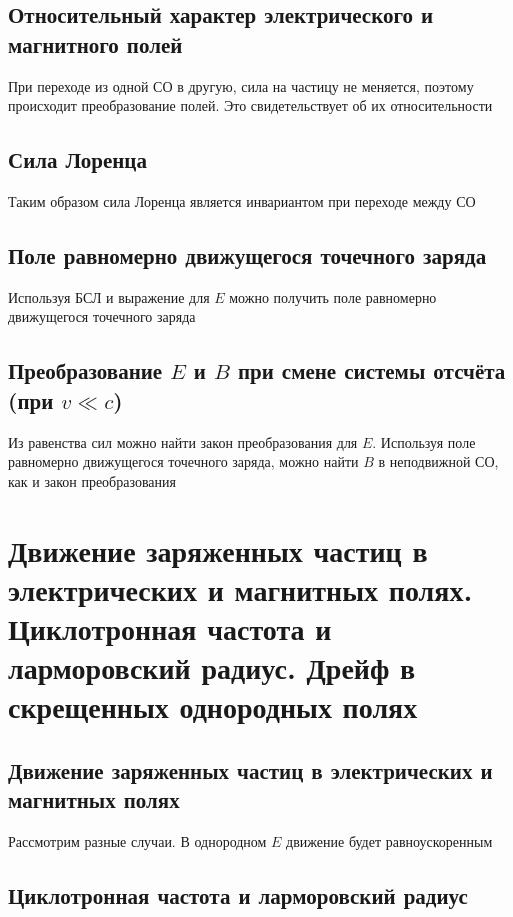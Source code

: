 \documentclass[a4paper, 14pt]{article}
\begin{document}
    \subsection{Относительный характер электрического и магнитного полей}
    
    При переходе из одной СО в другую, сила на частицу не меняется, поэтому происходит преобразование полей.
    Это свидетельствует об их относительности
    
    \subsection{Сила Лоренца}
    
    Таким образом сила Лоренца является инвариантом при переходе между СО
    
    \subsection{Поле равномерно движущегося точечного заряда}
    
    Используя БСЛ и выражение для $E$ можно получить поле равномерно движущегося точечного заряда
    
    \subsection{Преобразование $E$ и $B$ при смене системы отсчёта (при $v \ll c$)}
    
    Из равенства сил можно найти закон преобразования для $E$.
    Используя поле равномерно движущегося точечного заряда, можно найти $B$ в неподвижной СО, как и закон преобразования
    
    \section{Движение заряженных частиц в электрических и магнитных полях.
    Циклотронная частота и ларморовский радиус.
    Дрейф в скрещенных однородных полях}
    
    \subsection{Движение заряженных частиц в электрических и магнитных полях}
    
    Рассмотрим разные случаи.
    В однородном $E$ движение будет равноускоренным
    
    \subsection{Циклотронная частота и ларморовский радиус}
    
\end{document}
